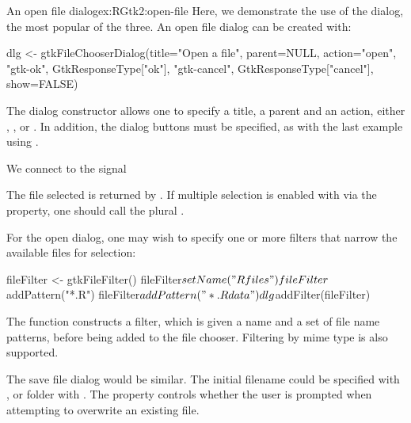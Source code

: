 \begin{example}{An open file dialog}{ex:RGtk2:open-file}
  Here, we demonstrate the use of the dialog, the most popular of the
  three.  An open file dialog can be created with:
\begin{Schunk}
\begin{Sinput}
 dlg <- gtkFileChooserDialog(title="Open a file", 
                      parent=NULL, action="open",
                      "gtk-ok", GtkResponseType["ok"],
                      "gtk-cancel", GtkResponseType["cancel"],
                      show=FALSE)
\end{Sinput}
\end{Schunk}
%
The dialog constructor allows one to specify a title, a parent and an
action, either , ,  or
. In addition, the dialog buttons must be
specified, as with the last example using
.

We connect to the  signal
\begin{Schunk}
\end{Schunk}
%
The file selected is returned by
. If multiple selection is enabled
with via the  property, one should call the
plural .

For the open dialog, one may wish to specify one or more filters that
narrow the available files for selection:
\begin{Schunk}
\begin{Sinput}
 fileFilter <- gtkFileFilter()
 fileFilter$setName("R files")
 fileFilter$addPattern("*.R")
 fileFilter$addPattern("*.Rdata")
 dlg$addFilter(fileFilter)
\end{Sinput}
\end{Schunk}
%
The  function constructs a filter, which is
given a name and a set of file name patterns, before being added to
the file chooser. Filtering by mime type is also supported.

\end{example}

The save file dialog would be similar. The initial filename could be
specified with , or folder with
. The
 property controls whether the user is
prompted when attempting to overwrite an existing file.

